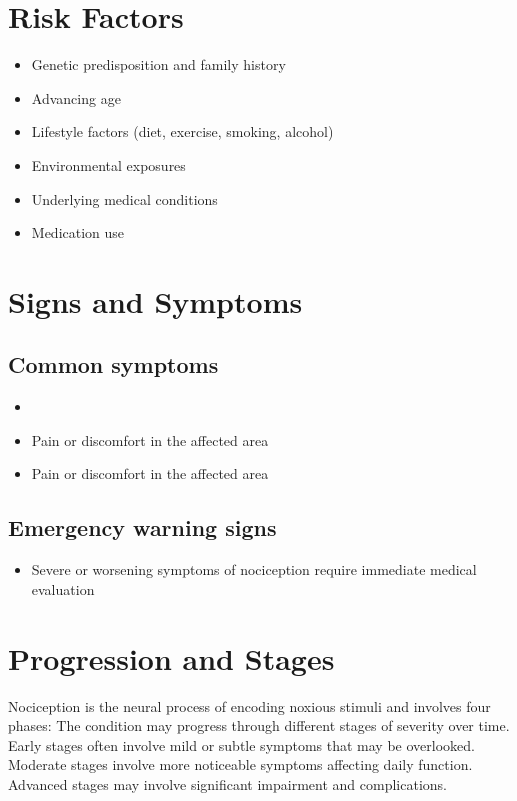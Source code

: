 \section{Risk Factors}

\begin{itemize}[noitemsep]
  \item Genetic predisposition and family history
  \item Advancing age
  \item Lifestyle factors (diet, exercise, smoking, alcohol)
  \item Environmental exposures
  \item Underlying medical conditions
  \item Medication use
\end{itemize}
\section{Signs and Symptoms}

\subsection{Common symptoms}
\begin{itemize}[noitemsep]
  \item \item Pain or discomfort in the affected area    \item Pain or discomfort in the affected area
  \end{itemize}

\subsection{Emergency warning signs}
\begin{itemize}[noitemsep]
  \item Severe or worsening symptoms of nociception require immediate medical evaluation
\end{itemize}
\section{Progression and Stages}
Nociception is the neural process of encoding noxious stimuli and involves four phases: The condition may progress through different stages of severity over time. Early stages often involve mild or subtle symptoms that may be overlooked. Moderate stages involve more noticeable symptoms affecting daily function. Advanced stages may involve significant impairment and complications.
